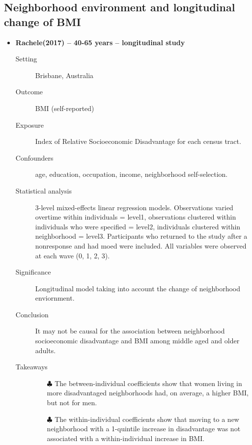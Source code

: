 \documentclass{article}
\begin{document}
\subsection{Neighborhood environment and longitudinal change of BMI}
\begin{itemize}
	\item{\bf Rachele(2017) -- 40-65 years -- longitudinal study} 
		\begin{description}
			\item[Setting] Brisbane, Australia
			\item[Outcome] BMI (self-reported)
			\item[Exposure] Index of Relative Socioeconomic Disadvantage for each census tract.
			\item[Confounders] age, education, occupation, income, neighborhood self-selection.
			\item[Statistical analysis] 3-level mixed-effects linear regression models. Observations varied overtime within individuals = level1, observations clustered within individuals who were specified = level2, individuals clustered within neighborhood = level3. Participants who returned to the study after a nonresponse and had moed were included. All variables were  observed at each wave (0, 1, 2, 3).
			\item[Significance] Longitudinal model taking into account the change of neighborhood enviornment.
			\item[Conclusion] It may not be causal for the association between neighborhood socioeconomic disadvantage and BMI among middle aged and older adults.
			\item[Takeaways] \mbox{}\par
				\begin{itemize}
					\item[$\clubsuit$] The between-individual coefficients show that women living in more disadvantaged neighborhoods had, on average, a higher BMI, but not for men. 
					\item[$\clubsuit$] The within-individual coefficients show that moving to a new neighborhood with a 1-quintile increase in disadvantage was not associated with a within-individual increase in BMI.
				\end{itemize}
		\end{description}
\end{itemize}
\end{document}
